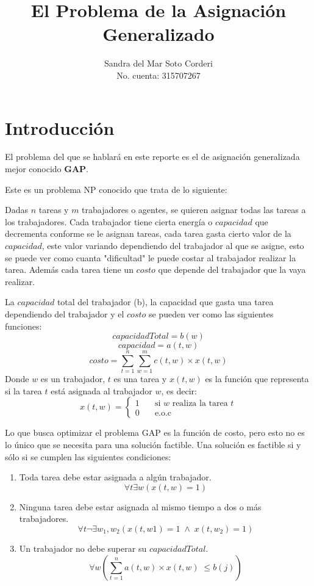 \documentclass{article}
\title{El Problema de la Asignación Generalizado}
\author{
  Sandra del Mar Soto Corderi\\
  No. cuenta: 315707267
}
\date{}
\begin{document}
\maketitle

\section{Introducción}

El problema del que se hablará en este reporte es el de asignación generalizada mejor conocido \textbf{GAP}. 

Este es un problema NP conocido que trata de lo siguiente:

Dadas $n$ tareas y $m$ trabajadores o agentes, se quieren asignar todas las tareas a los trabajadores. Cada trabajador tiene cierta energía o $capacidad$ que decrementa conforme se le asignan tareas, cada tarea gasta cierto valor de la $capacidad$, este valor variando dependiendo del trabajador al que se asigne, esto se puede ver como cuanta "dificultad" le puede costar al trabajador realizar la tarea. Además cada tarea tiene un $costo$ que depende del trabajador que la vaya realizar.

La $capacidad$ total del trabajador (b), la capacidad que gasta una tarea dependiendo del trabajador y el $costo$ se pueden ver como las siguientes funciones:
\[capacidadTotal=b(w)\]
\[capacidad=a(t,w)\] 
\[costo=\sum_{t=1}^{n}\sum_{w=1}^{m}c(t,w)\times x(t,w)\]
Donde $w$ es un trabajador, $t$ es una tarea y $x(t,w)$ es la función que 
representa si la tarea $t$ está asignada al trabajador $w$, es decir:
\[x(t,w)=
\begin{cases}
\text{1}&\quad\text{si $w$ realiza la tarea $t$}\\
\text{0}&\quad\text{e.o.c}
\end{cases}\]

Lo que busca optimizar el problema GAP es la función de costo, pero esto no es lo único que se necesita para una solución factible. Una solución es factible si y sólo si se cumplen las siguientes condiciones:
\begin{enumerate}
	\item Toda tarea debe estar asignada a algún trabajador.
	\[\forall t \exists w (x(t,w)=1)\]
	\item Ninguna tarea debe estar asignada al mismo tiempo a dos o más 
	trabajadores.
	\[\forall t \neg \exists w_1,w_2 (x(t,w1)=1 \;\wedge \; x(t,w_2)=1)\]
	\item Un trabajador no debe superar su $capacidadTotal$.
	\[\forall w \left(\sum_{t=1}^{n}a(t,w)\times x(t,w) \; \leq b(j)\right)\]
\end{enumerate}
\end{document}
